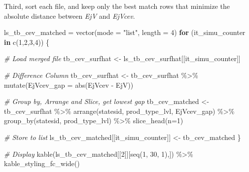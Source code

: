 \documentclass[
]{article}
\newenvironment{Shaded}{\begin{snugshade}}{\end{snugshade}}
\newcommand{\AttributeTok}[1]{\textcolor[rgb]{0.77,0.63,0.00}{#1}}
\newcommand{\CommentTok}[1]{\textcolor[rgb]{0.56,0.35,0.01}{\textit{#1}}}
\newcommand{\ControlFlowTok}[1]{\textcolor[rgb]{0.13,0.29,0.53}{\textbf{#1}}}
\newcommand{\DecValTok}[1]{\textcolor[rgb]{0.00,0.00,0.81}{#1}}
\newcommand{\FunctionTok}[1]{\textcolor[rgb]{0.00,0.00,0.00}{#1}}
\newcommand{\NormalTok}[1]{#1}
\newcommand{\OtherTok}[1]{\textcolor[rgb]{0.56,0.35,0.01}{#1}}
\newcommand{\SpecialCharTok}[1]{\textcolor[rgb]{0.00,0.00,0.00}{#1}}
\newcommand{\StringTok}[1]{\textcolor[rgb]{0.31,0.60,0.02}{#1}}
\begin{document}
Third, sort each file, and keep only the best match rows that minimize
the absolute distance between \emph{EjV} and \emph{EjVcev}.

\begin{Shaded}
\begin{Highlighting}[]
\NormalTok{ls\_tb\_cev\_matched }\OtherTok{=} \FunctionTok{vector}\NormalTok{(}\AttributeTok{mode =} \StringTok{"list"}\NormalTok{, }\AttributeTok{length =} \DecValTok{4}\NormalTok{)}
\ControlFlowTok{for}\NormalTok{ (it\_simu\_counter }\ControlFlowTok{in} \FunctionTok{c}\NormalTok{(}\DecValTok{1}\NormalTok{,}\DecValTok{2}\NormalTok{,}\DecValTok{3}\NormalTok{,}\DecValTok{4}\NormalTok{)) \{}

    \CommentTok{\# Load merged file}
\NormalTok{    tb\_cev\_surfhat }\OtherTok{\textless{}{-}}\NormalTok{ ls\_tb\_cev\_surfhat[[it\_simu\_counter]]}

    \CommentTok{\# Difference Column}
\NormalTok{    tb\_cev\_surfhat }\OtherTok{\textless{}{-}}\NormalTok{ tb\_cev\_surfhat }\SpecialCharTok{\%\textgreater{}\%} 
      \FunctionTok{mutate}\NormalTok{(}\AttributeTok{EjVcev\_gap =} \FunctionTok{abs}\NormalTok{(EjVcev }\SpecialCharTok{{-}}\NormalTok{ EjV))}
    
    \CommentTok{\# Group by, Arrange and Slice, get lowest gap}
\NormalTok{    tb\_cev\_matched }\OtherTok{\textless{}{-}}\NormalTok{ tb\_cev\_surfhat }\SpecialCharTok{\%\textgreater{}\%} 
      \FunctionTok{arrange}\NormalTok{(statesid, prod\_type\_lvl, EjVcev\_gap) }\SpecialCharTok{\%\textgreater{}\%}
      \FunctionTok{group\_by}\NormalTok{(statesid, prod\_type\_lvl) }\SpecialCharTok{\%\textgreater{}\%}
      \FunctionTok{slice\_head}\NormalTok{(}\AttributeTok{n=}\DecValTok{1}\NormalTok{)}

    \CommentTok{\# Store to list}
\NormalTok{    ls\_tb\_cev\_matched[[it\_simu\_counter]] }\OtherTok{\textless{}{-}}\NormalTok{ tb\_cev\_matched}
\NormalTok{\}}

\CommentTok{\# Display}
\FunctionTok{kable}\NormalTok{(ls\_tb\_cev\_matched[[}\DecValTok{2}\NormalTok{]][}\FunctionTok{seq}\NormalTok{(}\DecValTok{1}\NormalTok{, }\DecValTok{30}\NormalTok{, }\DecValTok{1}\NormalTok{),]) }\SpecialCharTok{\%\textgreater{}\%} \FunctionTok{kable\_styling\_fc\_wide}\NormalTok{()}
\end{Highlighting}
\end{Shaded}
\end{document}
